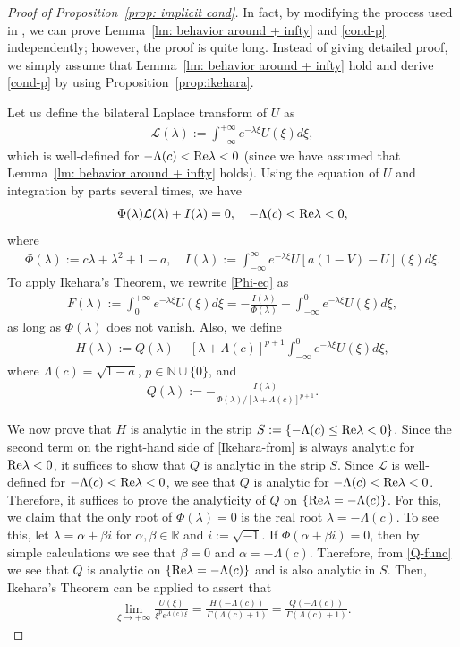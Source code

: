 \documentclass[11pt,a4paper]{article}
\numberwithin{equation}{section}
\numberwithin{figure}{section}
\newcommand\bea{\begin{eqnarray}}
\newcommand\eea{\end{eqnarray}}
\newcommand\beaa{\begin{eqnarray*}}
\newcommand\eeaa{\end{eqnarray*}}
\begin{document}
\begin{proof}[Proof of Proposition~\ref{prop: implicit cond}]
In fact, by modifying the process used in \cite{Guo Wu}, we can prove Lemma~\ref{lm: behavior around + infty} and
\eqref{cond-p} independently; however, the proof is quite long.
Instead of giving detailed proof,
we simply assume that Lemma~\ref{lm: behavior around + infty} hold and derive
\eqref{cond-p} by using Proposition~\ref{prop:ikehara}.


Let us  define the bilateral Laplace transform of $U$ as
\beaa
\mathcal{L}(\lambda):=\int_{-\infty}^{+\infty}e^{-\lambda \xi}U(\xi) d\xi,
\eeaa
which is well-defined for $-\Lambda(c)<{\rm Re} \lambda<0$
(since we have assumed that Lemma~\ref{lm: behavior around + infty} holds).
Using the equation of $U$ and integration by parts several times, we have
\bea\label{Phi-eq}
\Phi(\lambda)\mathcal{L}(\lambda)+I(\lambda)=0,\quad -\Lambda(c)<{\rm Re} \lambda<0,
\eea
where
\beaa
\Phi(\lambda):=c\lambda+\lambda^2+1-a,\quad I(\lambda):=\int_{-\infty}^{\infty}e^{-\lambda \xi}U[a(1-V)-U](\xi)d\xi.
\eeaa
To apply Ikehara's Theorem, we
rewrite \eqref{Phi-eq} as
\beaa
F(\lambda):=\int_{0}^{+\infty}e^{-\lambda \xi}U(\xi) d\xi
=-\frac{I(\lambda)}{\Phi(\lambda)}-\int_{-\infty}^{0}e^{-\lambda \xi}U(\xi) d\xi,
\eeaa
as long as $\Phi(\lambda)$ does not vanish.
Also, we define
\bea\label{Ikehara-from}
H(\lambda):=Q(\lambda)-[\lambda+\Lambda(c)]^{p+1}\int_{-\infty}^{0}e^{-\lambda \xi}U(\xi) d\xi,
\eea
where $\Lambda(c)=\sqrt{1-a}$, $p\in\mathbb{N}\cup\{0\}$, and
\bea\label{Q-func}
Q(\lambda):=-\frac{I(\lambda)}{\Phi(\lambda)/[\lambda+\Lambda(c)]^{p+1}}.
\eea

We now prove that $H$ is analytic in the strip $S:=\{-\Lambda(c)\leq {\rm Re}\lambda<0\}$.
Since the second term on the right-hand side of \eqref{Ikehara-from} is always analytic for ${\rm Re}\lambda<0$,
it suffices to show that $Q$ is analytic in the strip $S$.
Since $\mathcal{L}$ is well-defined for $-\Lambda(c)< {\rm Re}\lambda<0$, we see that
$Q$ is analytic for $-\Lambda(c)< {\rm Re}\lambda<0$. Therefore, it suffices to prove the
analyticity of $Q$ on $\{{\rm Re}\lambda=-\Lambda(c)\}$.
For this, we claim that the only root of $\Phi(\lambda)=0$ is the real root $\lambda=-\Lambda(c)$.
To see this, let $\lambda=\alpha +\beta i$ for $\alpha,\beta\in\mathbb{R}$ and $i:=\sqrt{-1}$. If
$\Phi(\alpha +\beta i)=0$, then by simple calculations we see that $\beta=0$ and $\alpha=-\Lambda(c)$.
Therefore, from \eqref{Q-func} we see that $Q$ is analytic on $\{{\rm Re}\lambda=-\Lambda(c)\}$ and is also analytic in $S$. Then, Ikehara's Theorem can be applied to assert that
\beaa
\lim_{\xi\to+\infty}\frac{U(\xi)}{{\xi}^{p}e^{\Lambda(c)\xi}}=\frac{H(-\Lambda(c))}{\Gamma(\Lambda(c)+1)}=
\frac{Q(-\Lambda(c))}{\Gamma(\Lambda(c)+1)}.
\eeaa


\end{proof}
\end{document}
